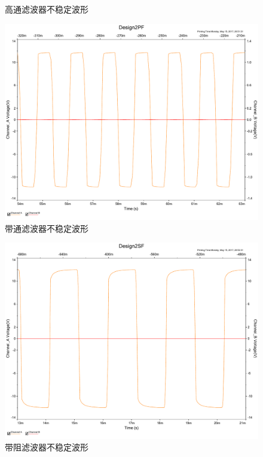 \documentclass[UTF8,a4paper]{paper}
\begin{document}
\begin{multicols}{2}
\begin{figure}[H]
\caption{高通滤波器不稳定波形}
\label{BIHF}
\end{figure}
\begin{figure}[H]
\centering
\includegraphics[width=\columnwidth]{2PF.pdf}
\caption{带通滤波器不稳定波形}
\label{BIPF}
\end{figure}
\begin{figure}[H]
\centering
\includegraphics[width=\columnwidth]{2SF.pdf}
\caption{带阻滤波器不稳定波形}
\label{BISF}
\end{figure}
\end{multicols}
\end{document}
